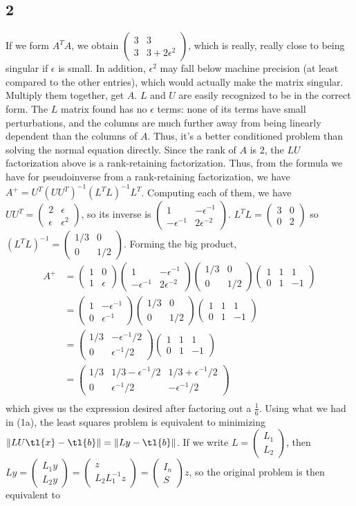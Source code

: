 \documentclass{article}
\newcommand{\ep}{\epsilon}
\newcommand{\openm}{\begin{pmatrix}}
\newcommand{\closem}{\end{pmatrix}}
\begin{document}
\subsection*{2}
If we form $A^TA$, we obtain $\openm3&3\\3&3+2\ep^2\closem$, which is really, really close to being singular if $\ep$ is small. In addition, $\ep^2$ may fall below machine precision (at least compared to the other entries), which would actually make the matrix singular.
Multiply them together, get $A$. $L$ and $U$ are easily recognized to be in the correct form.
The $L$ matrix found has no $\ep$ terms: none of its terms have small perturbations, and the columns are much further away from being linearly dependent than the columns of $A$. Thus, it's a better conditioned problem than solving the normal equation directly.
Since the rank of $A$ is 2, the $LU$ factorization above is a rank-retaining factorization. Thus, from the formula we have for pseudoinverse from a rank-retaining factorization, we have $A^+=U^T(UU^T)^{-1}(L^TL)^{-1}L^T$. Computing each of them, we have $UU^T=\openm2&\ep\\\ep&\ep^2\closem$, so its inverse is $\openm1&-\ep^{-1}\\-\ep^{-1}&2\ep^{-2}\closem$. $L^TL=\openm3&0\\0&2\closem$ so $(L^TL)^{-1}=\openm1/3&0\\0&1/2\closem$. Forming the big product, 
\begin{align*}
    A^+&=\openm1&0\\1&\ep\closem\openm1&-\ep^{-1}\\-\ep^{-1}&2\ep^{-2}\closem\openm1/3&0\\0&1/2\closem\openm1&1&1\\0&1&-1\closem\\
       &=\openm1&-\ep^{-1}\\0&\ep^{-1}\closem\openm1/3&0\\0&1/2\closem\openm1&1&1\\0&1&-1\closem\\
       &=\openm1/3&-\ep^{-1}/2\\0&\ep^{-1}/2\closem\openm1&1&1\\0&1&-1\closem\\
       &=\openm1/3&1/3-\ep^{-1}/2&1/3+\ep^{-1}/2\\0&\ep^{-1}/2&-\ep^{-1}/2\closem\\
\end{align*}
which gives us the expression desired after factoring out a $\frac{1}{6}$.
Using what we had in (1a), the least squares problem is equivalent to minimizing $\|LU\tl{x}-\tl{b}\|=\|Ly-\tl{b}\|$. If we write $L=\openm L_1\\L_2\closem$, then $Ly=\openm L_1y\\L_2y\closem=\openm z\\L_2L_1^{-1}z\closem=\openm I_n\\S\closem z$, so the original problem is then equivalent to 
\end{document}
